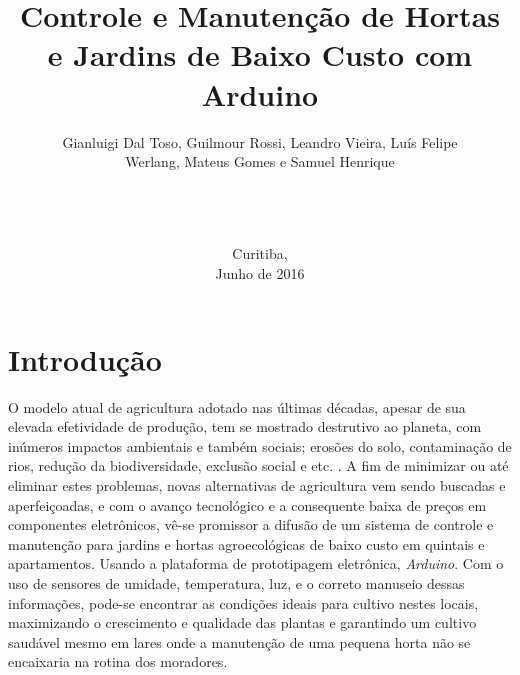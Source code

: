 \documentclass[a4paper,12pt]{article}
\begin{document}
\title{Controle e Manutenção de Hortas e Jardins de Baixo Custo com Arduino}
\author{Gianluigi Dal Toso, Guilmour Rossi, Leandro Vieira, Luís Felipe\\Werlang, Mateus Gomes e Samuel Henrique\\\texttt{}\\\\\\
}

\date{Curitiba, \\Junho de 2016}

\maketitle

\newpage


\tableofcontents


\newpage

\listoffigures



\makenomenclature

\newpage
\section{Introdução}

O modelo atual de agricultura adotado nas últimas décadas, apesar de sua elevada efetividade de produção, tem se mostrado destrutivo ao planeta, com inúmeros impactos ambientais e também sociais; erosões do solo, contaminação de rios, redução da biodiversidade, exclusão social e etc. \cite[p.~23]{medeiros}. A fim de minimizar ou até eliminar estes problemas, novas alternativas de agricultura vem sendo buscadas e aperfeiçoadas, e com o avanço tecnológico \cite{guterres} e a consequente baixa de preços em componentes  eletrônicos, vê-se promissor a difusão de um sistema de controle e manutenção para jardins e hortas agroecológicas de baixo custo em quintais e apartamentos. Usando a plataforma de prototipagem eletrônica, \textit{Arduino}. Com o uso de sensores de umidade, temperatura, luz, e o correto manuseio dessas informações, pode-se encontrar as condições ideais para cultivo nestes locais, maximizando o crescimento e qualidade das plantas e garantindo um cultivo saudável mesmo em lares onde a manutenção de uma pequena horta não se encaixaria na rotina dos moradores.
\end{document}
